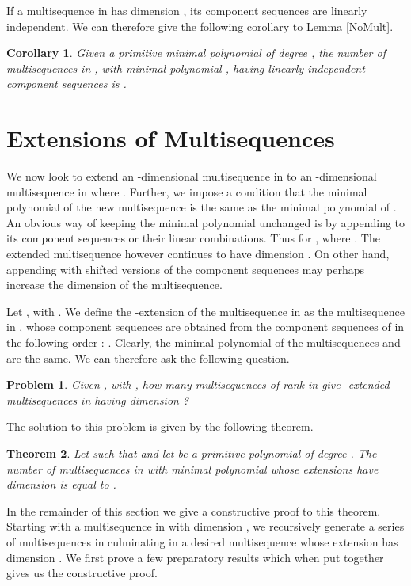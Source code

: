 \documentclass[letterpaper, 12 pt]{article}  \usepackage{amssymb}
\newtheorem{theorem}{Theorem}[section]
\newtheorem{corollary}[theorem]{Corollary}
\newtheorem{problem}{Problem}
\begin{document}
If a multisequence in  has dimension , its component sequences are
linearly independent. We can therefore give the following corollary to Lemma
\ref{NoMult}.

\begin{corollary}
\label{maincor}
Given a primitive minimal polynomial  of degree , the number of
multisequences in , with minimal polynomial , having linearly
independent component sequences is
.
\end{corollary}

\section{Extensions of Multisequences}

We now look to extend an -dimensional 
multisequence  in   to an -dimensional multisequence in  
where . Further, we impose a condition that the minimal polynomial of the new multisequence is 
the same as the minimal polynomial of . An obvious way of keeping the 
minimal polynomial unchanged is by appending to  its component sequences 
or their linear combinations. Thus  for , 
where . The extended multisequence however continues to have dimension .
On other hand, appending  with shifted versions of the component sequences
may perhaps increase the dimension of the multisequence.

Let , with . We define
the -extension of the multisequence  in  as the multisequence
 in , whose component sequences are obtained from the component 
sequences of  in the following order :  . Clearly, the
minimal polynomial of the 
multisequences  and  are the same. We can
therefore ask the following question.

\begin{problem}
\label{mainProblem}
 Given , 
with , how many multisequences  of rank  in  give 
-extended multisequences in  having dimension ?
\end{problem}

The solution to this problem is given by the following theorem.

 \begin{theorem}
\label{maintheorem}
Let  such that 
 and let  be a primitive polynomial of degree
. The number  of multisequences in
 with minimal polynomial  whose extensions have dimension 
is equal to .
\end{theorem}

In the remainder of this section we give a constructive proof to this theorem.
Starting with a multisequence in  with dimension , we recursively
generate a series
of  multisequences in  culminating in a desired multisequence
whose extension has dimension . We first prove a few preparatory
results which when put together gives us the constructive proof.   
 
\end{document}

